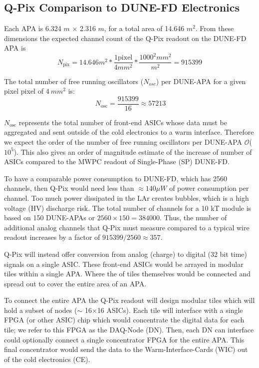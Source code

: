 \subsection{Q-Pix Comparison to DUNE-FD Electronics}
Each APA is 6.324 $\unit{m}$ $\times$ 2.316 $\unit{m}$, for a total area of 14.646 $\unit{m^{2}}$.
From these dimensions the expected channel count of the Q-Pix readout on the DUNE-FD APA is
\begin{equation}
  N_{\mathrm{pix}} = 14.646 m^{2} * \frac{1 \mathrm{pixel}}{4 mm^{2}} * \frac{ 1000^{2} mm^{2} }{m^{2}} = 915399
\end{equation}

The total number of free running oscillators ($N_{osc}$) per DUNE-APA for a given pixel pixel of $4~mm^{2}$ is:
\begin{equation}~\label{eq:nosc}
N_{\mathrm{osc}} = \frac{915399}{16} \approx 57213
\end{equation}

$N_{\mathrm{osc}}$ represents the total number of front-end ASICs whose data must be aggregated and sent outside of the cold electronics to a warm interface.
Therefore we expect the order of the number of free running oscillators per DUNE-APA $\mathcal{O}$($10^5$).
This also gives an order of magnitude estimate of the increase of number of ASICs compared to the MWPC readout of Single-Phase (SP) DUNE-FD.

To have a comparable power consumption to DUNE-FD, which has 2560 channels, then Q-Pix would need less than $\approx 140 \mu W$ of power consumption per channel.
Too much power dissipated in the LAr creates bubbles, which is a high voltage (HV) discharge risk.
The total number of channels for a 10 kT module is based on 150 DUNE-APAs or $2560\times 150 = 384000$.
Thus, the number of additional analog channels that Q-Pix must measure compared to a typical wire readout increases by a factor of $915399 / 2560 \approx 357$.

Q-Pix will instead offer conversion from analog (charge) to digital (32 bit time) signals on a single ASIC.
These front-end ASICs would be arrayed in modular tiles within a single APA.
Where the of tiles themselves would be connected and spread out to cover the entire area of an APA.

To connect the entire APA the Q-Pix readout will design modular tiles which will hold a subset of nodes ($\sim$ 16$\times$16 ASICs).
Each tile will interface with a single FPGA (or other ASIC) chip which would concentrate the digital data for each tile; we refer to this FPGA as the DAQ-Node (DN).
Then, each DN can interface could optionally connect a single concentrator FPGA for the entire APA.
This final concentrator would send the data to the Warm-Interface-Cards (WIC) out of the cold electronics (CE).

